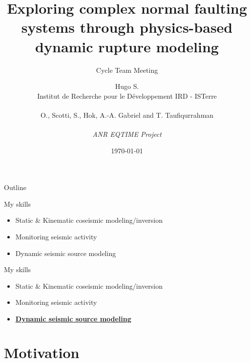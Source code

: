 \documentclass{beamer}
\title{{\normalsize \vskip 1cm Exploring complex normal faulting systems through physics-based dynamic rupture modeling}}
\subtitle{\small Cycle Team Meeting}
\author{Hugo S. \\ {\tiny Institut de Recherche pour le Développement IRD - ISTerre} \\ 
\\
O., Scotti, S., Hok, A.-A. Gabriel and T. Taufiqurrahman \\
\\
\textit{ANR EQTIME Project}
}
\date[2021]{\today}
\begin{document}

\begin{frame}
    \titlepage
\end{frame}

\begin{frame}
 {Outline}
 
 \tableofcontents
 
\end{frame}


\begin{frame}
 {My skills}
 
 \begin{itemize}
  \item Static \& Kinematic coseismic modeling/inversion \pause
  \\
  \item Monitoring seismic activity \pause
  \\
  \item Dynamic seismic source modeling
 \end{itemize}

 
\end{frame}


\begin{frame}
 {My skills}
 
 \begin{itemize}
  \item Static \& Kinematic coseismic modeling/inversion
  \\
  \item Monitoring seismic activity
  \\
  \item \underline{\bf Dynamic seismic source modeling}
 \end{itemize}
 
\end{frame}


\section{Motivation}
\end{document}
